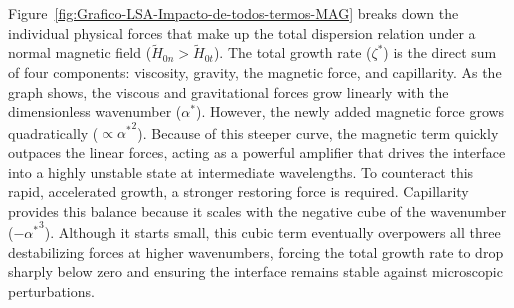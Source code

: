 Figure~\ref{fig:Grafico-LSA-Impacto-de-todos-termos-MAG} breaks down the individual physical forces that make up the total dispersion relation under a normal magnetic field ($\tilde{H}_{0n} > \tilde{H}_{0t}$). The total growth rate ($\zeta^*$) is the direct sum of four components: viscosity, gravity, the magnetic force, and capillarity. As the graph shows, the viscous and gravitational forces grow linearly with the dimensionless wavenumber ($\alpha^*$). However, the newly added magnetic force grows quadratically ($\propto {\alpha^*}^2$). Because of this steeper curve, the magnetic term quickly outpaces the linear forces, acting as a powerful amplifier that drives the interface into a highly unstable state at intermediate wavelengths. To counteract this rapid, accelerated growth, a stronger restoring force is required. Capillarity provides this balance because it scales with the negative cube of the wavenumber ($-{\alpha^*}^3$). Although it starts small, this cubic term eventually overpowers all three destabilizing forces at higher wavenumbers, forcing the total growth rate to drop sharply below zero and ensuring the interface remains stable against microscopic perturbations.